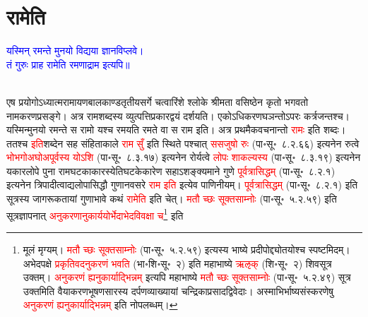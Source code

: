 \section[रामेति]{रामेति}
\centering\textcolor{blue}{यस्मिन् रमन्ते मुनयो विद्यया ज्ञानविप्लवे।\nopagebreak\\
तं गुरुः प्राह रामेति रमणाद्राम इत्यपि॥}\nopagebreak\\
\\
\begin{sloppypar}\justifying\noindent\hspace{10mm} एष प्रयोगोऽध्यात्म\-रामायण\-बाल\-काण्ड\-तृतीय\-सर्गे चत्वारिंशे श्लोके श्रीमता वसिष्ठेन कृतो भगवतो नाम\-करण\-प्रसङ्गे। अत्र राम\-शब्दस्य व्युत्पत्ति\-प्रकार\-द्वयं दर्शयति। एकोऽधिकरण\-घञन्तोऽपरः कर्त्रजन्तश्च। यस्मिन्मुनयो रमन्ते स रामो यश्च रमयति रमते वा स राम इति। अत्र प्रथमैक\-वचनान्तो \textcolor{red}{रामः} इति शब्दः। ततश्च \textcolor{red}{इति}\-शब्देन सह संहिता\-काले \textcolor{red}{राम सुँ} इति स्थिते पश्चात् \textcolor{red}{ससजुषो रुः} (पा॰सू॰~८.२.६६) इत्यनेन रुत्वे \textcolor{red}{भो\-भगो\-अघो\-अपूर्वस्य योऽशि} (पा॰सू॰~८.३.१७) इत्यनेन रोर्यत्वे \textcolor{red}{लोपः शाकल्यस्य} (पा॰सू॰~८.३.१९) इत्यनेन यकारलोपे पुना राम\-घटकाकारस्येति\-घटकेकारेण सहाऽशङ्क्यमाने गुणे \textcolor{red}{पूर्वत्रासिद्धम्‌} (पा॰सू॰~८.२.१) इत्यनेन त्रिपादीत्वाद्यलोपासिद्धौ गुणानवसरे \textcolor{red}{राम इति} इत्येव पाणिनीयम्। \textcolor{red}{पूर्वत्रासिद्धम्‌} (पा॰सू॰~८.२.१) इति सूत्रस्य जागरूकतायां गुणाभावे कथं \textcolor{red}{रामेति} इति चेत्। \textcolor{red}{मतौ च्छः सूक्तसाम्नोः} (पा॰सू॰~५.२.५९) इति सूत्र\-ज्ञापनात् \textcolor{red}{अनुकरणानु\-कार्ययोर्भेदाभेद\-विवक्षा च}\footnote{मूलं मृग्यम्। \textcolor{red}{मतौ च्छः सूक्तसाम्नोः} (पा॰सू॰~५.२.५९) इत्यस्य भाष्ये प्रदीपोद्द्योतयोश्च स्पष्टमिदम्। अभेदपक्षे \textcolor{red}{प्रकृतिवदनुकरणं भवति} (भा॰शि॰सू॰~२) इति महाभाष्ये \textcolor{red}{ऋऌक्‌} (शि॰सू॰~२) शिवसूत्र उक्तम्। \textcolor{red}{अनुकरणं ह्यनुकार्याद्भिन्नम्‌} इत्यपि महाभाष्ये \textcolor{red}{मतौ च्छः सूक्तसाम्नोः} (पा॰सू॰~५.२.४९) सूत्र उक्तमिति वैयाकरण\-भूषण\-सारस्य दर्पण\-व्याख्यायां चन्द्रिका\-प्रसाद\-द्विवेदाः। अस्माभिर्भाष्य\-संस्करणेषु \textcolor{red}{अनुकरणं ह्यनुकार्याद्भिन्नम्‌} इति नोपलब्धम्।} इति

\end{sloppypar}
